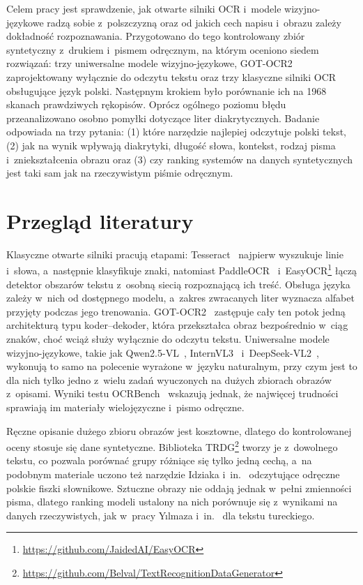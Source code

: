 \documentclass[runningheads,orivec]{llncs}
\begin{document}
Celem pracy jest sprawdzenie, jak otwarte silniki OCR i~modele wizyjno-językowe radzą sobie z~polszczyzną oraz od jakich cech
napisu i~obrazu zależy dokładność rozpoznawania. Przygotowano do tego kontrolowany zbiór syntetyczny z~drukiem
i~pismem odręcznym, na którym oceniono siedem rozwiązań: trzy uniwersalne modele wizyjno-językowe, \mbox{GOT-OCR2}
zaprojektowany wyłącznie do odczytu tekstu oraz trzy klasyczne silniki OCR obsługujące język polski. Następnym krokiem było porównanie ich na 1968 skanach prawdziwych rękopisów.
Oprócz ogólnego poziomu błędu przeanalizowano osobno pomyłki dotyczące liter diakrytycznych. Badanie odpowiada na trzy pytania: (1) które narzędzie najlepiej odczytuje
polski tekst, (2) jak na wynik wpływają diakrytyki, długość słowa, kontekst, rodzaj pisma i~zniekształcenia
obrazu oraz (3) czy ranking systemów na danych syntetycznych jest taki sam jak na rzeczywistym piśmie
odręcznym.

\section{Przegląd literatury}

Klasyczne otwarte silniki pracują etapami: Tesseract~\cite{smith2007} najpierw wyszukuje linie i~słowa,
a~następnie klasyfikuje znaki, natomiast PaddleOCR~\cite{li2022ppocrv3}
i~EasyOCR\footnote{\url{https://github.com/JaidedAI/EasyOCR}} łączą detektor obszarów tekstu z~osobną
siecią rozpoznającą ich treść. Obsługa języka zależy w~nich od dostępnego modelu, a~zakres zwracanych liter
wyznacza alfabet przyjęty podczas jego trenowania. \mbox{GOT-OCR2}~\cite{wei2024got} zastępuje cały ten potok jedną
architekturą typu koder--dekoder, która przekształca obraz bezpośrednio w~ciąg znaków, choć wciąż służy
wyłącznie do odczytu tekstu. Uniwersalne modele wizyjno-językowe, takie jak \mbox{Qwen2.5-VL}~\cite{bai2025qwen25vl},
InternVL3~\cite{zhu2025internvl3} i~\mbox{DeepSeek-VL2}~\cite{wu2024deepseekvl2}, wykonują to samo na polecenie wyrażone
w~języku naturalnym, przy czym jest to dla nich tylko jedno z~wielu zadań wyuczonych na dużych zbiorach obrazów
z~opisami. Wyniki testu OCRBench~\cite{liu2024ocrbench} wskazują jednak, że najwięcej trudności sprawiają im
materiały wielojęzyczne i~pismo odręczne.

Ręczne opisanie dużego zbioru obrazów jest kosztowne, dlatego do kontrolowanej oceny stosuje się dane
syntetyczne. Biblioteka TRDG\footnote{\url{https://github.com/Belval/TextRecognitionDataGenerator}} tworzy je
z~dowolnego tekstu, co pozwala porównać grupy różniące się tylko jedną cechą, a~na podobnym materiale uczono też
narzędzie Idziaka i~in.~\cite{idziak2021} odczytujące odręczne polskie fiszki słownikowe. Sztuczne obrazy nie
oddają jednak w~pełni zmienności pisma, dlatego ranking modeli ustalony na nich porównuje się z~wynikami
na danych rzeczywistych, jak w~pracy Yılmaza i~in.~\cite{yilmaz2026} dla tekstu tureckiego.
\end{document}
